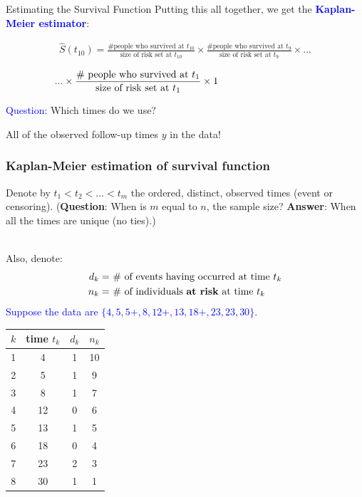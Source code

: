 \documentclass[10pt,t]{beamer}
\begin{document}
\begin{frame}{Estimating the Survival Function}
	Putting this all together, we get the \textcolor{blue}{\textbf{Kaplan-Meier estimator}}:
	
	
	
	\medskip
	
	\small
	
	\begin{align*}
	\widehat{S}(t_{10})=\frac{\text{\# people who survived at }t_{10}}{\text{size of risk set at }t_{10}}\times \frac{\text{\# people who survived at }t_9}{\text{size of risk set at }t_9 }\times ...
	\end{align*}
	
	\begin{align*}
	\textcolor{white}{\widehat{S}(t_{10})=}...\times \frac{\text{\# people who survived at }t_1}{\text{size of risk set at }t_1 }\times 1\textcolor{white}{\times \frac{\text{\# people who survived at }t_9}{\text{size of risk set at }t_9 }}
	\end{align*}
	
	\normalsize
	
	\bigskip
	
	\textcolor{blue}{Question:} Which times do we use?
	
	\medskip
	
	All of the observed follow-up times $y$ in the data!

	
\end{frame}


\begin{frame}
	\frametitle{Kaplan-Meier estimation of survival function}
	\vspace{-0.8cm}
	Denote by $t_1 < t_2 < \dots < t_m$ the ordered, distinct, observed times (event or censoring). (\textbf{Question}: When is $m$ equal to $n$, the sample size?   \textbf{Answer}: When all the times are unique (no ties).)  
	\\ ~\
	
	Also, denote: 
	\begin{align*}
	d_k = & \ \text{\# of events having occurred at time $t_k$} \\
	n_k = & \ \text{\# of individuals \textbf{at risk} at time $t_k$}
	\end{align*}
	\textcolor{blue}{Suppose the data are $\{4, 5, 5+, 8, 12+, 13, 18+, 23, 23, 30\}$}.  
	
	\begin{center}
		\begin{tabular}{|c|c|c|c|}
			\hline
			$k$ & time $t_k$ & $d_k$ & $n_k$ \\
			\hline
			1 & 4 & 1 & 10 \\
			2& 5 & 1 & 9 \\
			3& 8 & 1 & 7 \\
			4&12 & 0 & 6 \\
			5&13 & 1 & 5 \\
			6&18 & 0 & 4 \\
			7&23 & 2 & 3 \\
			8&30 & 1 & 1 \\
			\hline
		\end{tabular}
	\end{center}
\end{frame}
\end{document}

